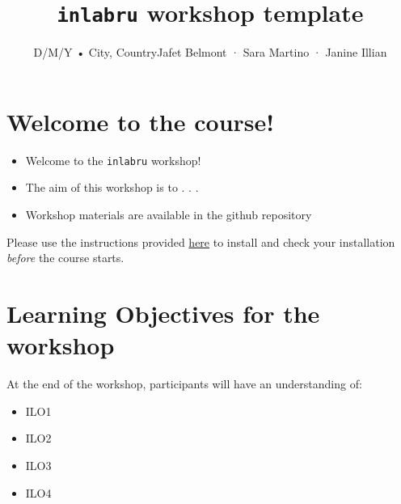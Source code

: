 \documentclass[
  letterpaper,
  DIV=11,
  numbers=noendperiod]{scrartcl}
\title{\texttt{inlabru} workshop template}
\subtitle{D/M/Y • City, CountryJafet Belmont · Sara Martino · Janine
Illian}
\author{}
\date{}
\makeatletter
\providecommand{\tightlist}{%
  \setlength{\itemsep}{0pt}\setlength{\parskip}{0pt}}
\renewcommand{\maketitle}{\bgroup\setlength{\parindent}{0pt}
\begin{flushleft}
  {\sffamily\huge\textbf{\MakeUppercase{\@title}}} \vspace{0.3cm} \newline
  {\Large {\@subtitle}} \newline
  \@author
\end{flushleft}\egroup
}
\makeatother
\begin{document}
\maketitle

\pagestyle{mystyle}


\section{Welcome to the course!}\label{welcome-to-the-course}

\begin{itemize}
\tightlist
\item
  Welcome to the \texttt{inlabru} workshop!
\item
  The aim of this workshop is to . . .
\item
  Workshop materials are available in the github repository
\end{itemize}

\begin{tcolorbox}[enhanced jigsaw, arc=.35mm, bottomrule=.15mm, bottomtitle=1mm, breakable, colback=white, colbacktitle=quarto-callout-warning-color!10!white, colframe=quarto-callout-warning-color-frame, coltitle=black, left=2mm, leftrule=.75mm, opacityback=0, opacitybacktitle=0.6, rightrule=.15mm, title=\textcolor{quarto-callout-warning-color}{\faExclamationTriangle}\hspace{0.5em}{Important! ⚠️}, titlerule=0mm, toprule=.15mm, toptitle=1mm]

Please use the instructions provided \href{Install_software.qmd}{here}
to install and check your installation \emph{before} the course starts.

\end{tcolorbox}

\section{Learning Objectives for the
workshop}\label{learning-objectives-for-the-workshop}

At the end of the workshop, participants will have an understanding of:

\begin{itemize}
\tightlist
\item
  ILO1
\item
  ILO2
\item
  ILO3
\item
  ILO4
\end{itemize}
\end{document}
